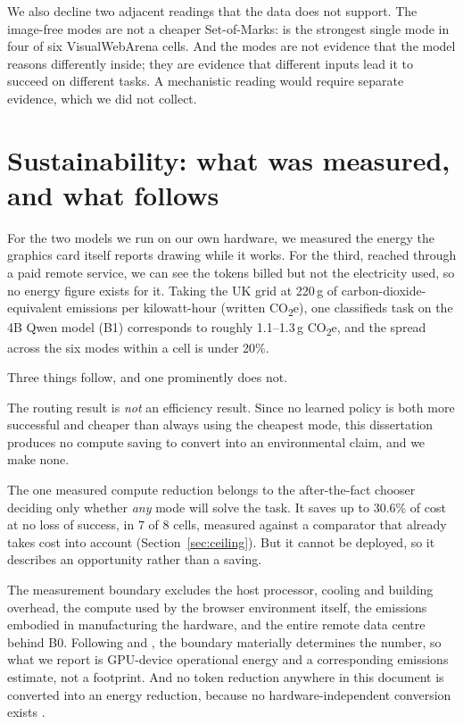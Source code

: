 We also decline two adjacent readings that the data does not support. The
image-free modes are not a cheaper Set-of-Marks: \mSoM{} is the strongest single
mode in four of six VisualWebArena cells. And the modes are not evidence that
the model reasons differently inside; they are evidence that different inputs
lead it to succeed on different tasks. A mechanistic reading
would require separate evidence, which we did not collect.

\section{Sustainability: what was measured, and what follows}
\label{sec:sustainability-disc}

For the two models we run on our own hardware, we measured the energy the
graphics card itself reports drawing while it works. For the third, reached
through a paid remote service, we can see the tokens billed but not the
electricity used, so no energy figure exists for it. Taking the UK grid at
220\,g of carbon-dioxide-equivalent emissions per kilowatt-hour (written
CO\textsubscript{2}e), one classifieds task on the 4B Qwen model (B1)
corresponds to roughly 1.1--1.3\,g CO\textsubscript{2}e, and the spread across
the six modes within a cell is under 20\%.

Three things follow, and one prominently does not.

The routing result is \emph{not} an efficiency result. Since no learned policy
is both more successful and cheaper than always using the cheapest mode, this
dissertation produces no compute saving to convert into an environmental
claim, and we make none.

The one measured compute reduction belongs to the after-the-fact chooser
deciding only whether \emph{any} mode will solve the task. It saves up to 30.6\%
of cost at no loss of success, in 7 of 8 cells, measured against a comparator
that already takes cost into account (Section~\ref{sec:ceiling}). But it
cannot be deployed, so it describes an opportunity rather than a saving.

The measurement boundary excludes the host processor, cooling and building
overhead, the compute used by the browser environment itself, the emissions
embodied in manufacturing the hardware, and the entire remote data centre
behind B0. Following \citet{gupta2022chasing} and
\citet{luccioni2022bloom}, the boundary materially determines the number, so
what we report is GPU-device operational energy and a corresponding emissions estimate, not a footprint. And no token reduction anywhere in this document is
converted into an energy reduction, because no hardware-independent conversion
exists \citep{fernandez2025energy}.

